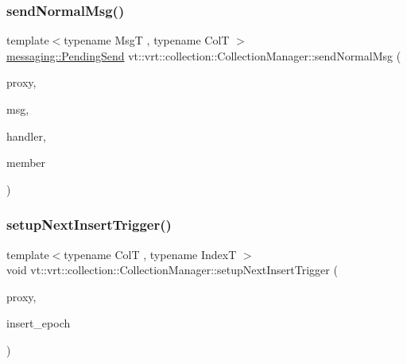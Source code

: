 \mbox{\label{structvt_1_1vrt_1_1collection_1_1_collection_manager_a9b58618d5d3eec7ac198b7c465288599}} 
\subsubsection{\texorpdfstring{send\+Normal\+Msg()}{sendNormalMsg()}}
{\footnotesize\ttfamily template$<$typename MsgT , typename ColT $>$ \\
\hyperlink{structvt_1_1messaging_1_1_pending_send}{messaging\+::\+Pending\+Send} vt\+::vrt\+::collection\+::\+Collection\+Manager\+::send\+Normal\+Msg (\begin{DoxyParamCaption}\item[{\hyperlink{namespacevt_1_1vrt_a620a5c8c59d13e513f690c74b4af516f}{Virtual\+Elm\+Proxy\+Type}$<$ ColT $>$ const \&}]{proxy,  }\item[{MsgT $\ast$}]{msg,  }\item[{\hyperlink{namespacevt_af64846b57dfcaf104da3ef6967917573}{Handler\+Type} const \&}]{handler,  }\item[{bool const}]{member }\end{DoxyParamCaption})}

\mbox{\label{structvt_1_1vrt_1_1collection_1_1_collection_manager_a1d93ed0d843deb241d788c305033b9e0}} 
\subsubsection{\texorpdfstring{setup\+Next\+Insert\+Trigger()}{setupNextInsertTrigger()}}
{\footnotesize\ttfamily template$<$typename ColT , typename IndexT $>$ \\
void vt\+::vrt\+::collection\+::\+Collection\+Manager\+::setup\+Next\+Insert\+Trigger (\begin{DoxyParamCaption}\item[{\hyperlink{namespacevt_a1b417dd5d684f045bb58a0ede70045ac}{Virtual\+Proxy\+Type} const \&}]{proxy,  }\item[{\hyperlink{namespacevt_a985a5adf291c34a3ca263b3378388236}{Epoch\+Type} const \&}]{insert\+\_\+epoch }\end{DoxyParamCaption})}

